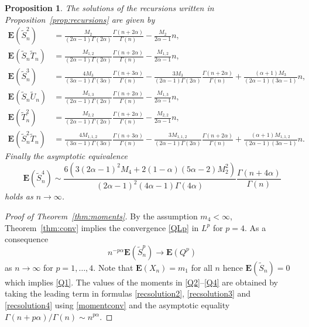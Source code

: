 \documentclass[12pt,a4paper]{article}
\newtheorem{prop}[thm]{Proposition}
\newcommand{\E}{\mathbf E}
\newcommand{\wt}{\widetilde}
\numberwithin{equation}{section}
\begin{document}
\begin{prop}\label{prop:recsolutions}
The solutions of the recursions written in Proposition~\ref{prop:recursions} are given by
\begin{align}
\E(\wt S_n^2)&=\frac{M_2}{(2\alpha-1)\Gamma(2\alpha)}\frac{\Gamma(n+2\alpha)}{\Gamma(n)}-\frac{M_2}{2\alpha-1}n,\label{recsolution2}\\
\E(\wt S_n\wt T_n)&=\frac{M_{1,2}}{(2\alpha-1)\Gamma(2\alpha)}\frac{\Gamma(n+2\alpha)}{\Gamma(n)}-\frac{M_{1,2}}{2\alpha-1}n,\label{recsolution12}\\
\E(\wt S_n^3)&=\frac{4M_3}{(3\alpha-1)\Gamma(3\alpha)}\frac{\Gamma(n+3\alpha)}{\Gamma(n)}-\frac{3M_3}{(2\alpha-1)\Gamma(2\alpha)}\frac{\Gamma(n+2\alpha)}{\Gamma(n)}
+\frac{(\alpha+1)M_3}{(2\alpha-1)(3\alpha-1)}n,\label{recsolution3}\\
\E(\wt S_n\wt U_n)&=\frac{M_{1,3}}{(2\alpha-1)\Gamma(2\alpha)}\frac{\Gamma(n+2\alpha)}{\Gamma(n)}-\frac{M_{1,3}}{2\alpha-1}n,\label{recsolution13}\\
\E(\wt T_n^2)&=\frac{M_{2,2}}{(2\alpha-1)\Gamma(2\alpha)}\frac{\Gamma(n+2\alpha)}{\Gamma(n)}-\frac{M_{2,2}}{2\alpha-1}n,\label{recsolution22}\\
\E(\wt S_n^2\wt T_n)&=\frac{4M_{1,1,2}}{(3\alpha-1)\Gamma(3\alpha)}\frac{\Gamma(n+3\alpha)}{\Gamma(n)}-\frac{3M_{1,1,2}}{(2\alpha-1)\Gamma(2\alpha)}\frac{\Gamma(n+2\alpha)}{\Gamma(n)}
+\frac{(\alpha+1)M_{1,1,2}}{(2\alpha-1)(3\alpha-1)}n.\label{recsolution112}
\end{align}
Finally the asymptotic equivalence
\begin{equation}\label{recsolution4}
\E(\wt S_n^4)\sim\frac{6(3(2\alpha-1)^2M_4+2(1-\alpha)(5\alpha-2)M_2^2)}{(2\alpha-1)^2(4\alpha-1)\Gamma(4\alpha)}\frac{\Gamma(n+4\alpha)}{\Gamma(n)}
\end{equation}
holds as $n\to\infty$.
\end{prop}

\begin{proof}[Proof of Theorem~\ref{thm:moments}]
By the assumption $m_4<\infty$, Theorem~\ref{thm:conv} implies the convergence \eqref{QLp} in $L^p$ for $p=4$.
As a consequence
\begin{equation}\label{momentconv}
n^{-p\alpha}\E(\wt S_n^p)\to\E(Q^p)
\end{equation}
as $n\to\infty$ for $p=1,\dots,4$.
Note that $\E(X_n)=m_1$ for all $n$ hence $\E(\wt S_n)=0$ which implies \eqref{Q1}.
The values of the moments in \eqref{Q2}--\eqref{Q4} are obtained by taking the leading term
in formulas \eqref{recsolution2}, \eqref{recsolution3} and \eqref{recsolution4} using \eqref{momentconv}
and the asymptotic equality $\Gamma(n+p\alpha)/\Gamma(n)\sim n^{p\alpha}$.
\end{proof}
\end{document}
